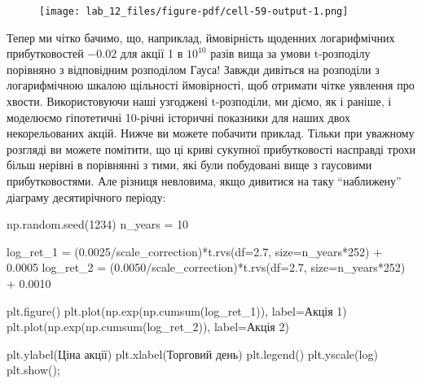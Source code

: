 \documentclass[
  letterpaper,
]{report}
\newenvironment{Shaded}{\begin{snugshade}}{\end{snugshade}}
\newcommand{\DecValTok}[1]{\textcolor[rgb]{0.68,0.00,0.00}{#1}}
\newcommand{\FloatTok}[1]{\textcolor[rgb]{0.68,0.00,0.00}{#1}}
\newcommand{\NormalTok}[1]{\textcolor[rgb]{0.00,0.23,0.31}{#1}}
\newcommand{\OperatorTok}[1]{\textcolor[rgb]{0.37,0.37,0.37}{#1}}
\newcommand{\StringTok}[1]{\textcolor[rgb]{0.13,0.47,0.30}{#1}}
\begin{document}
\begin{figure}[H]

{\centering \texttt{[image: lab\_12\_files/figure-pdf/cell-59-output-1.png]}

}

\end{figure}

Тепер ми чітко бачимо, що, наприклад, ймовірність щоденних логарифмічних
прибутковостей \(-0.02\) для акції 1 в \(10^{10}\) разів вища за умови
t-розподілу порівняно з відповідним розподілом Гауса! Завжди дивіться на
розподіли з логарифмічною шкалою щільності ймовірності, щоб отримати
чітке уявлення про хвости. Використовуючи наші узгоджені t-розподіли, ми
діємо, як і раніше, і моделюємо гіпотетичні 10-річні історичні показники
для наших двох некорельованих акцій. Нижче ви можете побачити приклад.
Тільки при уважному розгляді ви можете помітити, що ці криві сукупної
прибутковості насправді трохи більш нерівні в порівнянні з тими, які
були побудовані вище з гаусовими прибутковостями. Але різниця невловима,
якщо дивитися на таку ``наближену'' діаграму десятирічного періоду:

\begin{Shaded}
\begin{Highlighting}[]
\NormalTok{np.random.seed(}\DecValTok{1234}\NormalTok{)}
\NormalTok{n\_years }\OperatorTok{=} \DecValTok{10}

\NormalTok{log\_ret\_1 }\OperatorTok{=}\NormalTok{ (}\FloatTok{0.0025}\OperatorTok{/}\NormalTok{scale\_correction)}\OperatorTok{*}\NormalTok{t.rvs(df}\OperatorTok{=}\FloatTok{2.7}\NormalTok{, size}\OperatorTok{=}\NormalTok{n\_years}\OperatorTok{*}\DecValTok{252}\NormalTok{) }\OperatorTok{+} \FloatTok{0.0005}
\NormalTok{log\_ret\_2 }\OperatorTok{=}\NormalTok{ (}\FloatTok{0.0050}\OperatorTok{/}\NormalTok{scale\_correction)}\OperatorTok{*}\NormalTok{t.rvs(df}\OperatorTok{=}\FloatTok{2.7}\NormalTok{, size}\OperatorTok{=}\NormalTok{n\_years}\OperatorTok{*}\DecValTok{252}\NormalTok{) }\OperatorTok{+} \FloatTok{0.0010}

\NormalTok{plt.figure()}
\NormalTok{plt.plot(np.exp(np.cumsum(log\_ret\_1)), label}\OperatorTok{=}\StringTok{\textquotesingle{}Акція 1\textquotesingle{}}\NormalTok{)}
\NormalTok{plt.plot(np.exp(np.cumsum(log\_ret\_2)), label}\OperatorTok{=}\StringTok{\textquotesingle{}Акція 2\textquotesingle{}}\NormalTok{)}

\NormalTok{plt.ylabel(}\StringTok{\textquotesingle{}Ціна акції\textquotesingle{}}\NormalTok{)}
\NormalTok{plt.xlabel(}\StringTok{\textquotesingle{}Торговий день\textquotesingle{}}\NormalTok{)}
\NormalTok{plt.legend()}
\NormalTok{plt.yscale(}\StringTok{\textquotesingle{}log\textquotesingle{}}\NormalTok{)}
\NormalTok{plt.show()}\OperatorTok{;}
\end{Highlighting}
\end{Shaded}
\end{document}
